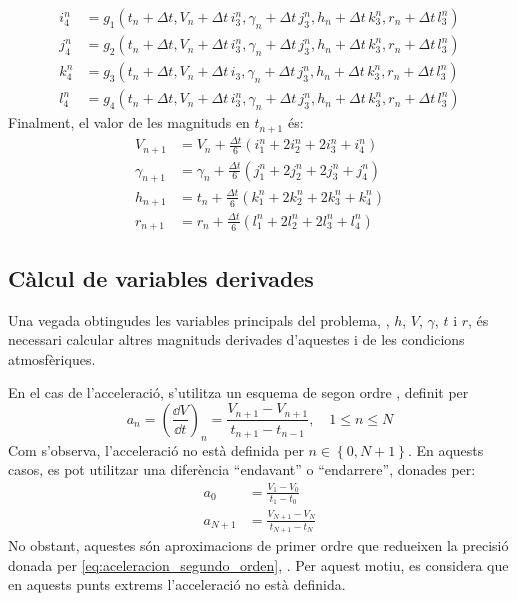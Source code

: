\begin{align}
    i_4^n &= g_1 \left( t_n + \Delta t, V_n + \Delta t \, i_3^n, \gamma_n + \Delta t \, j_3^n, 
    h_n + \Delta t \, k_3^n, r_n + \Delta t \, l_3^n \right) \\
    j_4^n &= g_2 \left( t_n + \Delta t, V_n + \Delta t \, i_3^n, \gamma_n + \Delta t \, j_3^n, 
    h_n + \Delta t \, k_3^n, r_n + \Delta t \, l_3^n \right) \\
    k_4^n &= g_3 \left( t_n + \Delta t, V_n + \Delta t \, i_3, \gamma_n + \Delta t \, j_3^n, 
    h_n + \Delta t \, k_3^n, r_n + \Delta t \, l_3^n \right) \\
    l_4^n &= g_4 \left( t_n + \Delta t, V_n + \Delta t \, i_3^n, \gamma_n + \Delta t \, j_3^n, 
    h_n + \Delta t \, k_3^n, r_n + \Delta t \, l_3^n \right)
\end{align}
Finalment, el valor de les magnituds en $t_{n+1}$ és:
\begin{align}
    V_{n+1} &= V_n              + \frac{\Delta t}{6} \left( i_1^n + 2 i_2^n + 2 i_3^n + i_4^n \right) \\
    \gamma_{n+1} &= \gamma_n    + \frac{\Delta t}{6} \left( j_1^n + 2 j_2^n + 2 j_3^n + j_4^n \right) \\
    h_{n+1} &= t_n              + \frac{\Delta t}{6} \left( k_1^n + 2 k_2^n + 2 k_3^n + k_4^n \right) \\
    r_{n+1} &= r_n              + \frac{\Delta t}{6} \left( l_1^n + 2 l_2^n + 2 l_3^n + l_4^n \right)
\end{align}

\subsection{Càlcul de variables derivades}

Una vegada obtingudes les variables principals del problema, \ie, $h$, $V$, $\gamma$, $t$ i $r$, és necessari calcular altres magnituds derivades d'aquestes i de les condicions atmosfèriques. 

En el cas de l'acceleració, s'utilitza un esquema de segon ordre \cite{kundu_2}, definit per
\begin{equation} \label{eq:aceleracion_segundo_orden}
    a_n = \left( \frac{\dd V}{\dd t} \right)_n = 
    \frac{V_{n+1} - V_{n+1}}{t_{n+1} - t_{n-1}}, \quad 1 \leq n \leq N
\end{equation}
Com s'observa, l'acceleració no està definida per $n \in \left\{ 0, N+1 \right\}$. En aquests casos, es pot utilitzar una diferència ``endavant'' o ``endarrere'', donades per:
\begin{align}
    a_0 &= \frac{V_1 - V_0}{t_1 - t_0} \\
    a_{N+1} &= \frac{V_{N+1} - V_{N}}{t_{N+1} - t_{N}}
\end{align}
No obstant, aquestes són aproximacions de primer ordre que redueixen la precisió donada per \eqref{eq:aceleracion_segundo_orden}, \cite{kundu_2}. Per aquest motiu, es considera que en aquests punts extrems l'acceleració no està definida.

